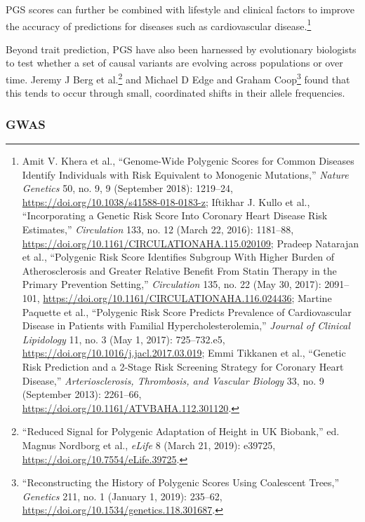 \documentclass[
]{book}
\begin{document}
PGS scores can further be combined with lifestyle and clinical factors to improve the accuracy of predictions for diseases such as cardiovascular disease.\footnote{Amit V. Khera et al., {``Genome-Wide Polygenic Scores for Common Diseases Identify Individuals with Risk Equivalent to Monogenic Mutations,''} \emph{Nature Genetics} 50, no. 9, 9 (September 2018): 1219--24, \url{https://doi.org/10.1038/s41588-018-0183-z}; Iftikhar J. Kullo et al., {``Incorporating a {Genetic Risk Score Into Coronary Heart Disease Risk Estimates},''} \emph{Circulation} 133, no. 12 (March 22, 2016): 1181--88, \url{https://doi.org/10.1161/CIRCULATIONAHA.115.020109}; Pradeep Natarajan et al., {``Polygenic {Risk Score Identifies Subgroup With Higher Burden} of {Atherosclerosis} and {Greater Relative Benefit From Statin Therapy} in the {Primary Prevention Setting},''} \emph{Circulation} 135, no. 22 (May 30, 2017): 2091--101, \url{https://doi.org/10.1161/CIRCULATIONAHA.116.024436}; Martine Paquette et al., {``Polygenic Risk Score Predicts Prevalence of Cardiovascular Disease in Patients with Familial Hypercholesterolemia,''} \emph{Journal of Clinical Lipidology} 11, no. 3 (May 1, 2017): 725--732.e5, \url{https://doi.org/10.1016/j.jacl.2017.03.019}; Emmi Tikkanen et al., {``Genetic {Risk Prediction} and a 2-{Stage Risk Screening Strategy} for {Coronary Heart Disease},''} \emph{Arteriosclerosis, Thrombosis, and Vascular Biology} 33, no. 9 (September 2013): 2261--66, \url{https://doi.org/10.1161/ATVBAHA.112.301120}.}

Beyond trait prediction, PGS have also been harnessed by evolutionary biologists to test whether a set of causal variants are evolving across populations or over time. Jeremy J Berg et al.\footnote{{``Reduced Signal for Polygenic Adaptation of Height in {UK Biobank},''} ed. Magnus Nordborg et al., \emph{eLife} 8 (March 21, 2019): e39725, \url{https://doi.org/10.7554/eLife.39725}.} and Michael D Edge and Graham Coop\footnote{{``Reconstructing the {History} of {Polygenic Scores Using Coalescent Trees},''} \emph{Genetics} 211, no. 1 (January 1, 2019): 235--62, \url{https://doi.org/10.1534/genetics.118.301687}.} found that this tends to occur through small, coordinated shifts in their allele frequencies.

\hypertarget{gwas}{%
\subsubsection{GWAS}\label{gwas}}
\end{document}
